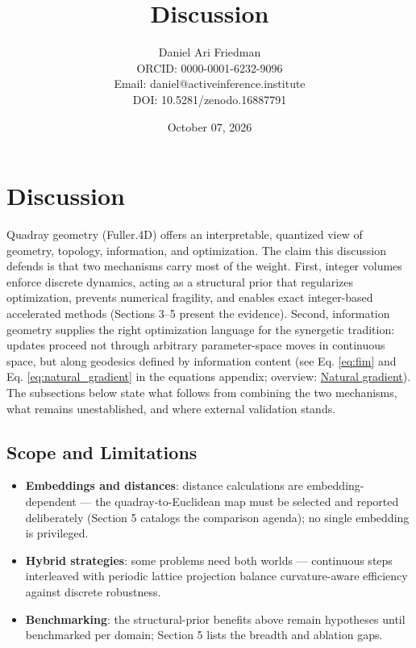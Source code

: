 \documentclass[
  10pt,
]{article}
\title{Discussion}
\author{Daniel Ari Friedman\\ ORCID: 0000-0001-6232-9096\\ Email: daniel@activeinference.institute\\ DOI: 10.5281/zenodo.16887791}
\date{October 07, 2026}
\providecommand{\tightlist}{%
  \setlength{\itemsep}{0pt}\setlength{\parskip}{0pt}}
\begin{document}
\maketitle

{
\hypersetup{linkcolor=black}
\setcounter{tocdepth}{3}
\tableofcontents
}
\section{Discussion}\label{discussion}

Quadray geometry (Fuller.4D) offers an interpretable, quantized view of
geometry, topology, information, and optimization. The claim this
discussion defends is that two mechanisms carry most of the weight.
First, integer volumes enforce discrete dynamics, acting as a structural
prior that regularizes optimization, prevents numerical fragility, and
enables exact integer-based accelerated methods (Sections 3--5 present
the evidence). Second, information geometry supplies the right
optimization language for the synergetic tradition: updates proceed not
through arbitrary parameter-space moves in continuous space, but along
geodesics defined by information content (see Eq. \eqref{eq:fim} and Eq.
\eqref{eq:natural_gradient} in the equations appendix; overview:
\href{https://en.wikipedia.org/wiki/Natural_gradient}{Natural
gradient}). The subsections below state what follows from combining the
two mechanisms, what remains unestablished, and where external
validation stands.

\subsection{Scope and Limitations}\label{scope-and-limitations}

\begin{itemize}
\tightlist
\item
  \textbf{Embeddings and distances}: distance calculations are
  embedding-dependent --- the quadray-to-Euclidean map must be selected
  and reported deliberately (Section 5 catalogs the comparison agenda);
  no single embedding is privileged.
\item
  \textbf{Hybrid strategies}: some problems need both worlds ---
  continuous steps interleaved with periodic lattice projection balance
  curvature-aware efficiency against discrete robustness.
\item
  \textbf{Benchmarking}: the structural-prior benefits above remain
  hypotheses until benchmarked per domain; Section 5 lists the breadth
  and ablation gaps.
\end{itemize}
\end{document}
